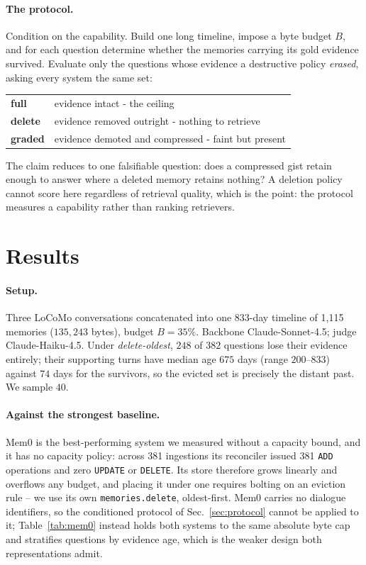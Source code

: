 \documentclass{article}
\theoremstyle{definition}\newtheorem{remark}{Remark}
\theoremstyle{plain}\newtheorem{proposition}{Proposition}
\begin{document}
\paragraph{The protocol.} Condition on the capability. Build one long timeline,
impose a byte budget $B$, and for each question determine whether the memories
carrying its gold evidence survived. Evaluate only the questions whose evidence
a destructive policy \emph{erased}, asking every system the same set:

\begin{center}\small
\begin{tabular}{@{}ll@{}}
\textbf{full} & evidence intact - the ceiling \\
\textbf{delete} & evidence removed outright - nothing to retrieve \\
\textbf{graded} & evidence demoted and compressed - faint but present \\
\end{tabular}
\end{center}

The claim reduces to one falsifiable question: does a compressed gist retain
enough to answer where a deleted memory retains nothing? A deletion policy
cannot score here regardless of retrieval quality, which is the point: the
protocol measures a capability rather than ranking retrievers.

\section{Results}
\label{sec:main}

\paragraph{Setup.} Three LoCoMo \citep{maharana2024locomo} conversations
concatenated into one 833-day timeline of 1{,}115 memories
($135{,}243$ bytes), budget $B=35\%$. Backbone Claude-Sonnet-4.5; judge
Claude-Haiku-4.5. Under \emph{delete-oldest}, $248$ of $382$ questions lose
their evidence entirely; their supporting turns have median age $675$ days
(range $200$--$833$) against $74$ days for the survivors, so the evicted set
is precisely the distant past. We sample $40$.

\paragraph{Against the strongest baseline.} Mem0 \citep{chhikara2025mem0} is the
best-performing system we measured without a capacity bound, and it has no
capacity policy: across 381 ingestions its reconciler issued 381 \texttt{ADD}
operations and zero \texttt{UPDATE} or \texttt{DELETE}. Its store therefore
grows linearly and overflows any budget, and placing it under one requires
bolting on an eviction rule -- we use its own \texttt{memories.delete},
oldest-first. Mem0 carries no dialogue identifiers, so the conditioned protocol
of Sec.~\ref{sec:protocol} cannot be applied to it; Table~\ref{tab:mem0} instead
holds both systems to the same absolute byte cap and stratifies questions by
evidence age, which is the weaker design both representations admit.
\end{document}
